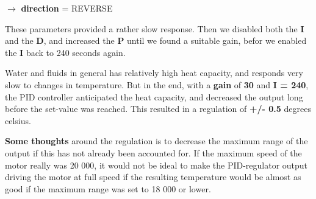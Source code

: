 $\rightarrow$ \textbf{direction} = REVERSE

These parameters provided a rather slow response. Then we disabled both the \textbf{I} and the \textbf{D}, and increased the \textbf{P} until we found a suitable gain, befor we enabled the \textbf{I} back to 240 seconds again.

Water and fluids in general has relatively high heat capacity, and responds very slow to changes in temperature. But in the end, with a \textbf{gain} of \textbf{30} and \textbf{I = 240}, the PID controller anticipated the heat capacity, and decreased the output long before the set-value was reached. This resulted in a regulation of \textbf{+/- 0.5} degrees celsius.

\textbf{Some thoughts } around the regulation is to decrease the maximum range of the output if this has not already been accounted for. If the maximum speed of the motor really was 20 000, it would not be ideal to make the PID-regulator output driving the motor at full speed if the resulting temperature would be almost as good if the maximum range was set to 18 000 or lower.